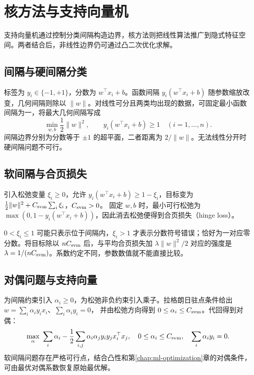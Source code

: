 \setcounter{chapter}{12} %
\chapter{核方法与支持向量机}
\label{chap:ml-kernels}

支持向量机通过控制分类间隔构造边界，核方法则把线性算法推广到隐式特征空间。两者结合后，非线性边界仍可通过凸二次优化求解。

\section{间隔与硬间隔分类}

标签为 $y_i\in\{-1,+1\}$，分数为 $w^\top x_i+b$。函数间隔 $y_i(w^\top x_i+b)$ 随参数缩放改变，几何间隔则除以 $\|w\|$。对线性可分且两类均出现的数据，可固定最小函数间隔为一，将最大几何间隔写成
\begin{equation}
 \min_{w,b}\frac12\|w\|^2,\qquad
 y_i(w^\top x_i+b)\geq1\quad(i=1,\ldots,n).
 \label{eq:ml-svm-primal}
\end{equation}
间隔边界分别为分数等于 $\pm1$ 的超平面，二者距离为 $2/\|w\|$。无法线性分开时硬间隔问题不可行。

\section{软间隔与合页损失}

引入松弛变量 $\xi_i\geq0$，允许 $y_i(w^\top x_i+b)\geq1-\xi_i$，目标变为
$\frac12\|w\|^2+C_{\rm svm}\sum_i\xi_i$，$C_{\rm svm}>0$。
固定 $w,b$ 时，最小可行松弛为 $\max(0,1-y_i(w^\top x_i+b))$，因此消去松弛便得到合页损失（hinge loss）。

$0<\xi_i\leq1$ 可能只表示位于间隔内，$\xi_i>1$ 才表示分数符号错误；恰好为一对应零分数。将目标除以 $nC_{\rm svm}$ 后，与平均合页损失加 $\lambda\|w\|^2/2$ 对应的强度是 $\lambda=1/(nC_{\rm svm})$。系数约定不同，参数数值就不能直接比较。

\section{对偶问题与支持向量}

为间隔约束引入 $\alpha_i\geq0$，为松弛非负约束引入乘子。拉格朗日驻点条件给出
$w=\sum_i\alpha_iy_ix_i$、$\sum_i\alpha_iy_i=0$，
并由松弛方向得到 $0\leq\alpha_i\leq C_{\rm svm}$。代回得到对偶：
\begin{equation}
 \max_\alpha\ \sum_i\alpha_i-\frac12\sum_{i,j}\alpha_i\alpha_jy_iy_jx_i^\top x_j,
 \quad 0\leq\alpha_i\leq C_{\rm svm},\quad \sum_i\alpha_iy_i=0.
 \label{eq:ml-svm-dual}
\end{equation}
软间隔问题存在严格可行点，结合凸性和第\ref{chap:ml-optimization}章的对偶条件，可由最优对偶系数恢复原始最优解。

